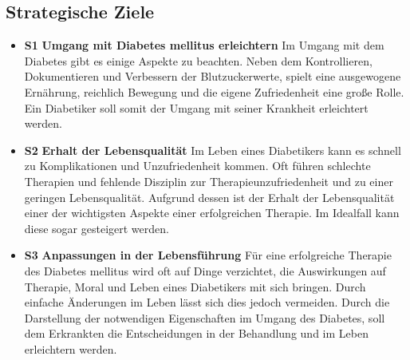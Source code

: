 \documentclass[a4paper,11pt]{article}%
\renewcommand{\\}{\vspace*{0.5\baselineskip} \newline}
\begin{document}
\subsection{Strategische Ziele}
\begin{itemize}
	\item \lbrack \textbf{S1}\rbrack  \textbf{ Umgang mit Diabetes mellitus erleichtern}\\
	Im Umgang mit dem Diabetes gibt es einige Aspekte zu beachten. Neben dem Kontrollieren, Dokumentieren und Verbessern der Blutzuckerwerte, spielt eine ausgewogene Ernährung, reichlich Bewegung und die eigene Zufriedenheit eine große Rolle. Ein Diabetiker soll somit der Umgang mit seiner Krankheit erleichtert werden. \\
	\item \lbrack \textbf{S2}\rbrack  \textbf{ Erhalt der Lebensqualität}\\
	Im Leben eines Diabetikers kann es schnell zu Komplikationen und Unzufriedenheit kommen. Oft führen schlechte Therapien und fehlende Disziplin zur Therapieunzufriedenheit und zu einer geringen Lebensqualität. Aufgrund dessen ist der Erhalt der Lebensqualität einer der wichtigsten Aspekte einer erfolgreichen Therapie. Im Idealfall kann diese sogar gesteigert werden. \\
	\item \lbrack \textbf{S3}\rbrack  \textbf{ Anpassungen in der Lebensführung} \\
	Für eine erfolgreiche Therapie des Diabetes mellitus wird oft auf Dinge verzichtet, die Auswirkungen auf Therapie, Moral und Leben eines Diabetikers mit sich bringen. Durch einfache Änderungen im Leben lässt sich dies jedoch vermeiden.  Durch die Darstellung der notwendigen Eigenschaften im Umgang des Diabetes, soll dem Erkrankten die Entscheidungen in der Behandlung und im Leben erleichtern werden. \\
\end{itemize}
\end{document}

